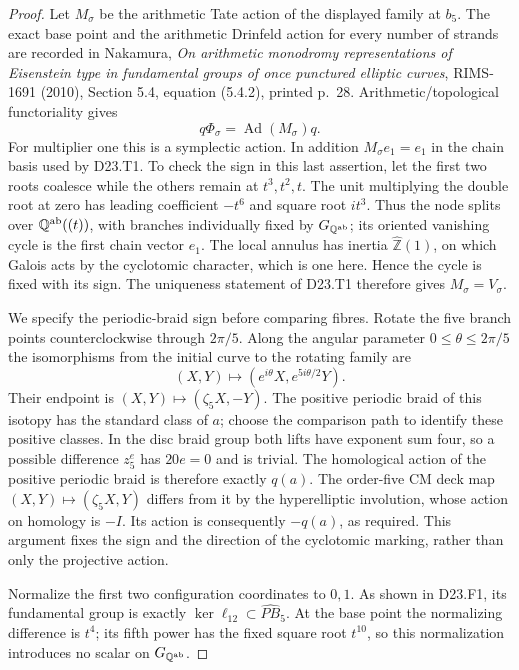 \begin{proof}
Let $M_\sigma$ be the arithmetic Tate action of the displayed
family at $b_5$. The exact base point and the arithmetic
Drinfeld action for every number of strands are recorded in
Nakamura, \emph{On arithmetic monodromy representations of
Eisenstein type in fundamental groups of once punctured
elliptic curves}, RIMS-1691 (2010), Section 5.4,
equation (5.4.2), printed p.~28. Arithmetic/topological
functoriality gives
\[
 q\Phi_\sigma=\operatorname{Ad}(M_\sigma)q.
\]
For multiplier one this is a symplectic action.  In addition
$M_\sigma e_1=e_1$ in the chain basis used by D23.T1.
To check the sign in this last assertion, let the first two
roots coalesce while the others remain at $t^3,t^2,t$.
The unit multiplying the double root at zero has leading
coefficient $-t^6$ and square root $it^3$.  Thus the node
splits over $\mathbb Q^{\rm ab}((t))$, with branches individually
fixed by $G_{\mathbb Q^{\rm ab}}$; its oriented vanishing
cycle is the first chain vector $e_1$.  The local annulus
has inertia $\widehat{\mathbb Z}(1)$, on which Galois acts
by the cyclotomic character, which is one here.  Hence the
cycle is fixed with its sign.  The uniqueness statement of
D23.T1 therefore gives $M_\sigma=V_\sigma$.

We specify the periodic-braid sign before comparing fibres.
Rotate the five branch points counterclockwise through
$2\pi/5$. Along the angular parameter $0\leq\theta\leq2\pi/5$
the isomorphisms from the initial curve to the rotating
family are
\[
 (X,Y)\longmapsto(e^{i\theta}X,e^{5i\theta/2}Y).
\]
Their endpoint is $(X,Y)\mapsto(\zeta_5X,-Y)$.
The positive periodic braid of this isotopy has the standard
class of $a$; choose the comparison path to identify these
positive classes. In the disc braid group both lifts have
exponent sum four, so a possible difference $z_5^e$ has
$20e=0$ and is trivial. The homological action of the
positive periodic braid is therefore exactly $q(a)$.
The order-five CM deck map $(X,Y)\mapsto(\zeta_5X,Y)$
differs from it by the hyperelliptic involution, whose
action on homology is $-I$. Its action is consequently
$-q(a)$, as required. This argument fixes the sign and
the direction of the cyclotomic marking, rather than only
the projective action.

Normalize the first two configuration coordinates to $0,1$.
As shown in D23.F1, its fundamental group is exactly
$\ker\ell_{12}\subset\widehat{PB}_5$.
At the base point the normalizing difference is $t^4$;
its fifth power has the fixed square root $t^{10}$, so this
normalization introduces no scalar on
$G_{\mathbb Q^{\rm ab}}$.


\end{proof}
